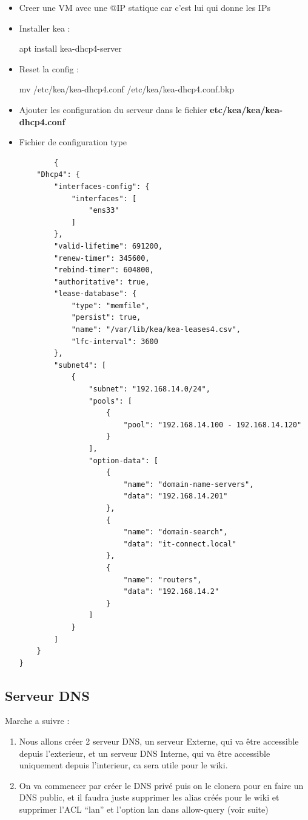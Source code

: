 \documentclass{article}
\begin{document}
\begin{itemize}
    \item Creer une VM avec une @IP statique car c’est lui qui donne les IPs
    \item Installer kea : \begin{rootcommand} apt install kea-dhcp4-server \end{rootcommand}
    \item Reset la config : \begin{rootcommand} mv /etc/kea/kea-dhcp4.conf /etc/kea/kea-dhcp4.conf.bkp \end{rootcommand}
    \item Ajouter les configuration du serveur dans le fichier \textbf{etc/kea/kea/kea-dhcp4.conf}
    \item Fichier de configuration type
    \newpage
    \begin{verbatim}
        {
    "Dhcp4": {
        "interfaces-config": {
            "interfaces": [
                "ens33"
            ]
        },
        "valid-lifetime": 691200,
        "renew-timer": 345600,
        "rebind-timer": 604800,
        "authoritative": true,
        "lease-database": {
            "type": "memfile",
            "persist": true,
            "name": "/var/lib/kea/kea-leases4.csv",
            "lfc-interval": 3600
        },
        "subnet4": [
            {
                "subnet": "192.168.14.0/24",
                "pools": [
                    {
                        "pool": "192.168.14.100 - 192.168.14.120"
                    }
                ],
                "option-data": [
                    {
                        "name": "domain-name-servers",
                        "data": "192.168.14.201"
                    },
                    {
                        "name": "domain-search",
                        "data": "it-connect.local"
                    },
                    {
                        "name": "routers",
                        "data": "192.168.14.2"
                    }
                ]
            }
        ]
    }
}
    \end{verbatim}

\end{itemize}

\subsection{Serveur DNS}
Marche a suivre :
\begin{enumerate}
	\item Nous allons créer 2 serveur DNS, un serveur Externe, qui va être accessible depuis l’exterieur, et un serveur DNS Interne, qui va être accessible uniquement depuis l’interieur, ca sera utile pour le wiki. 
	\item On va commencer par créer le DNS privé puis on le clonera pour en faire un DNS public, et il faudra juste supprimer les alias créés pour le wiki et supprimer l’ACL “lan” et l’option lan dans allow-query (voir suite)
\end{enumerate}
\end{document}
